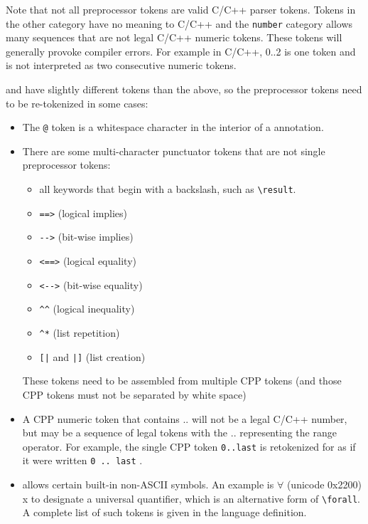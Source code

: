 Note that not all preprocessor tokens are valid C/C++ parser tokens. Tokens in the other category have no meaning to C/C++ and the \texttt{number} category allows many sequences that are not legal C/C++ numeric tokens. These tokens will generally provoke compiler errors. For example in C/C++, 0..2 is one token and is not interpreted as two consecutive numeric tokens.

\acsl and \acslpp have slightly different tokens than the above, so the preprocessor tokens need to be re-tokenized in some cases:
\begin{itemize}
	\item The \verb|@| token is a whitespace character in the interior of a \acslb annotation.
	\item There are some \acslb multi-character punctuator tokens that are not
	single preprocessor tokens:
	\begin{itemize}
        \item[] all \acslb keywords that begin with a backslash, such as \verb|\result|.
		\item \verb|==>| (logical implies)
		\item \verb|-->| (bit-wise implies)
		\item \verb|<==>| (logical equality)
		\item \verb|<-->| (bit-wise equality)
		\item \verb|^^| (logical inequality)
		\item \verb|^*| (list repetition)
		\item \verb:[|: and \verb:|]: (list creation)
	\end{itemize}
	These \acslb tokens need to be assembled from multiple CPP tokens (and those CPP tokens must not be separated by white space)
	\item A CPP numeric token that contains .. will not be a legal C/C++ number, but may be a sequence of
 legal \acslb tokens with the .. representing the range operator.  For example, the single CPP token \texttt{0..last} is retokenized for \acslb as if it were written \texttt{0 .. last} .
	\item \acslb allows certain built-in non-ASCII symbols.
    An example is 
		$\forall$ (unicode 0x2200) x to designate a universal quantifier,
    which is an alternative form of \verb|\forall|.
    A complete list of such tokens is given  in the \acslb language definition.
\end{itemize}

